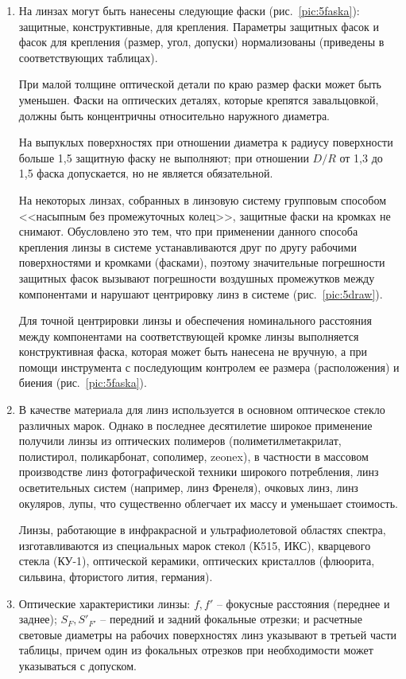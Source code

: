\begin{enumerate}
	\item На линзах могут быть нанесены следующие фаски (рис.~\ref{pic:5faska}): защитные, конструктивные, для крепления. Параметры защитных фасок и фасок для крепления (размер, угол, допуски) нормализованы (приведены в соответствующих таблицах).
	
	При малой толщине оптической детали по краю размер фаски может быть уменьшен. Фаски на оптических деталях, которые крепятся завальцовкой, должны быть концентричны относительно наружного диаметра.
	
	На выпуклых поверхностях при отношении диаметра к радиусу поверхности больше 1,5 защитную фаску не выполняют; при отношении $ D/R $ от 1,3 до 1,5 фаска допускается, но не является обязательной.
	
	На некоторых линзах, собранных в линзовую систему групповым способом <<насыпным без промежуточных колец>>, защитные фаски на кромках не снимают. Обусловлено это тем, что при применении данного способа крепления линзы в системе устанавливаются друг по другу рабочими поверхностями и кромками (фасками), поэтому значительные погрешности защитных фасок вызывают погрешности воздушных промежутков между компонентами и нарушают центрировку линз в системе (рис.~\ref{pic:5draw}).
	
	Для точной центрировки линзы и обеспечения номинального расстояния между компонентами на соответствующей кромке линзы выполняется конструктивная фаска, которая может быть нанесена не вручную, а при помощи инструмента с последующим контролем ее размера (расположения) и биения (рис.~\ref{pic:5faska}).
	
	\item В качестве материала для линз используется в основном оптическое стекло различных марок. Однако в последнее десятилетие широкое применение получили линзы из оптических полимеров (полиметилметакрилат, полистирол, поликарбонат, сополимер, zeonex), в частности в массовом производстве линз фотографической техники широкого потребления, линз осветительных систем (например, линз Френеля), очковых линз, линз окуляров, лупы, что существенно облегчает их массу и уменьшает стоимость.
	
	Линзы, работающие в инфракрасной и ультрафиолетовой областях спектра, изготавливаются из специальных марок стекол (К515, ИКС), кварцевого стекла (КУ-1), оптической керамики, оптических кристаллов (флюорита, сильвина, фтористого лития, германия).
	
	\item Оптические характеристики линзы: $ f, f' $ -- фокусные расстояния (переднее и заднее); $ S_F, S'_{F'} $  -- передний и задний фокальные отрезки; и расчетные световые диаметры на рабочих поверхностях линз указывают в третьей части таблицы, причем один из фокальных отрезков при необходимости может указываться с допуском.
	

\end{enumerate}
